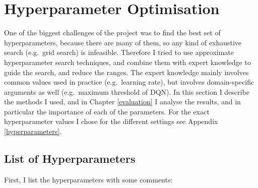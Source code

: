
\section{Hyperparameter Optimisation}

One of the biggest challenges of the project was to find the best set of hyperparameters, because there are many of them, so any kind of exhaustive search (e.g.\ grid search) is infeasible. Therefore I tried to use approximate hyperparameter search techniques, and combine them with expert knowledge to guide the search, and reduce the ranges. The expert knowledge mainly involves common values used in practice (e.g.\ learning rate), but involves domain-specific arguments as well (e.g.\ maximum threshold of DQN). In this section I describe the methods I used, and in Chapter \ref{evaluation} I analyse the results, and in particular the importance of each of the parameters. For the exact hyperparameter values I chose for the different settings see Appendix \ref{hyperparameters}.


\subsection{List of Hyperparameters}


First, I list the hyperparameters with some comments:


